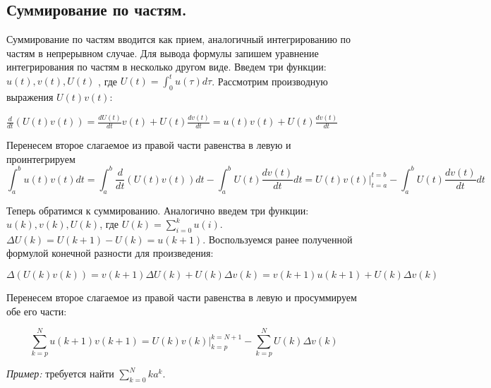 \subsection{Суммирование по частям.}
Суммирование по частям вводится как прием, аналогичный интегрированию по частям в непрерывном случае. Для вывода формулы
запишем уравнение интегрирования по частям в несколько другом виде. Введем три функции: $\displaystyle u(t), v(t), U(t)$
, где $\displaystyle U(t) = \int_{0}^{t}u(\tau)d\tau$. Рассмотрим производную выражения $U(t)v(t)$:

$\displaystyle \frac{d}{dt}\left(U(t)v(t)\right) = \frac{dU(t)}{dt}v(t) + U(t)\frac{dv(t)}{dt} = u(t)v(t) + U(t)\frac{dv(t)}{dt}$
\vspace{5pt}

Перенесем второе слагаемое из правой части равенства в левую и проинтегрируем
\begin{equation*}
    \int_a^b u(t)v(t)dt = \int_a^b \frac{d}{dt}\left(U(t)v(t)\right)dt - \int_a^b U(t) \frac{dv(t)}{dt}dt = U(t)v(t) \biggr\rvert_{t=a}^{t=b} - \int_a^b U(t)\frac{dv(t)}{dt}dt
\end{equation*}

Теперь обратимся к суммированию. Аналогично введем три функции: $\displaystyle u(k), v(k), U(k)$, где
$\displaystyle U(k) = \sum_{i=0}^k u(i)$. $\displaystyle \Delta U(k) = U(k+1) - U(k) = u(k+1)$.
Воспользуемся ранее полученной формулой конечной разности для произведения:

$\displaystyle \Delta \left(U(k)v(k)\right) = v(k+1) \Delta U(k) + U(k)\Delta v(k) = v(k+1)u(k+1) + U(k)\Delta v(k)$

Перенесем второе слагаемое из правой части равенства в левую и просуммируем обе его части:

\begin{theorem}
    \begin{equation}
        \sum_{k=p}^N u(k+1)v(k+1) = U(k)v(k) \bigg\rvert_{k=p}^{k=N+1} - \sum_{k=p}^N U(k) \Delta v(k)\label{eq:abel}
    \end{equation}
\end{theorem}

\emph{Пример:} требуется найти $\displaystyle \sum_{k=0}^N ka^k$.

